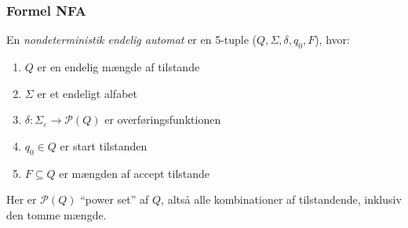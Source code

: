 \begin{frame}[allowframebreaks]
	\frametitle{Formel NFA}

	En \textit{nondeterministik endelig automat} er en 5-tuple ($Q, \Sigma, \delta, q_{0}, F$), hvor:

	\begin{enumerate}
		\item $Q$ er en endelig mængde af tilstande
		\item $\Sigma$ er et endeligt alfabet
		\item $\delta : \Sigma_{\varepsilon} \longrightarrow \mathcal{P}(Q)$ er overføringsfunktionen
		\item $q_{0} \in Q$ er start tilstanden
		\item $F \subseteq Q$ er mængden af accept tilstande
	\end{enumerate}

	Her er $\mathcal{P}(Q)$ ``power set'' af $Q$, altså alle kombinationer af tilstandende, inklusiv den tomme mængde.
\end{frame}

